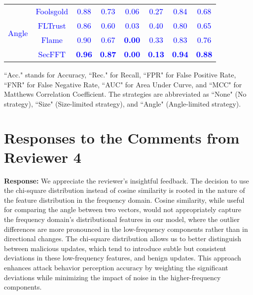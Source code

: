 \documentclass[a4paper,twoside,11pt,dvipsnames]{reviewresponse}
\begin{document}
\begin{table}[h!]
{\begin{tabular}{c|c|c|c|c|c|c|c}
\multirow{4}{*}{\textcolor{blue}{Angle}} & \textcolor{blue}{Foolsgold} & \textcolor{blue}{0.88} & \textcolor{blue}{0.73} & \textcolor{blue}{0.06} & \textcolor{blue}{0.27} & \textcolor{blue}{0.84} & \textcolor{blue}{0.68} \\ 
                       & \textcolor{blue}{FLTrust}   & \textcolor{blue}{0.86} & \textcolor{blue}{0.60} & \textcolor{blue}{0.03} & \textcolor{blue}{0.40} & \textcolor{blue}{0.80} & \textcolor{blue}{0.65} \\ 
                       & \textcolor{blue}{Flame}     & \textcolor{blue}{0.90} & \textcolor{blue}{0.67} & \textbf{\textcolor{blue}{0.00}} & \textcolor{blue}{0.33} & \textcolor{blue}{0.83} & \textcolor{blue}{0.76} \\ 
                       & \textcolor{blue}{SecFFT}    & \textbf{\textcolor{blue}{0.96}} & \textbf{\textcolor{blue}{0.87}} & \textbf{\textcolor{blue}{0.00}} & \textbf{\textcolor{blue}{0.13}} & \textbf{\textcolor{blue}{0.94}} & \textbf{\textcolor{blue}{0.88}} \\ \hline
\end{tabular}
}
\vspace{1em}
\begin{tablenotes}
\scriptsize
\item ``Acc." stands for Accuracy, ``Rec." for Recall, ``FPR" for False Positive Rate, ``FNR" for False Negative Rate, ``AUC" for Area Under Curve, and ``MCC" for Matthews Correlation Coefficient. The strategies are abbreviated as ``None" (No strategy), ``Size" (Size-limited strategy), and ``Angle" (Angle-limited strategy).
\end{tablenotes}
\label{tab:detect}
\end{table}

\newpage

\section{Responses to the Comments from Reviewer 4}

\textbf{Response:} 
We appreciate the reviewer’s insightful feedback. The decision to use the chi-square distribution instead of cosine similarity is rooted in the nature of the feature distribution in the frequency domain. Cosine similarity, while useful for comparing the angle between two vectors, would not appropriately capture the frequency domain’s distributional features in our model, where the outlier differences are more pronounced in the low-frequency components rather than in directional changes. The chi-square distribution allows us to better distinguish between malicious updates, which tend to introduce subtle but consistent deviations in these low-frequency features, and benign updates. This approach enhances attack behavior perception accuracy by weighting the significant deviations while minimizing the impact of noise in the higher-frequency components. 
\end{document}
